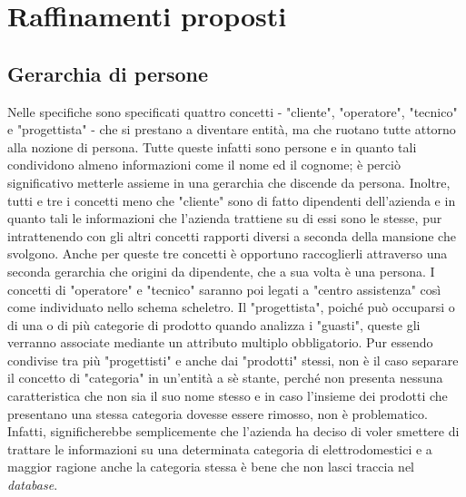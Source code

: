 \documentclass[a4paper, 12pt]{report}
\begin{document}
\section{Raffinamenti proposti}

\subsection{Gerarchia di persone}

Nelle specifiche sono specificati quattro concetti - "cliente", "operatore", "tecnico" e "progettista" - che si prestano a diventare entità, ma
che ruotano tutte attorno alla nozione di persona. Tutte queste infatti sono persone e in quanto tali condividono almeno informazioni come il nome
ed il cognome; è perciò significativo metterle assieme in una gerarchia che discende da persona. Inoltre, tutti e tre i concetti meno che "cliente"
sono di fatto dipendenti dell'azienda e in quanto tali le informazioni che l'azienda trattiene su di essi sono le stesse, pur intrattenendo con gli
altri concetti rapporti diversi a seconda della mansione che svolgono. Anche per queste tre concetti è opportuno raccoglierli attraverso una seconda
gerarchia che origini da dipendente, che a sua volta è una persona. I concetti di "operatore" e "tecnico" saranno poi legati a "centro assistenza"
così come individuato nello schema scheletro. Il "progettista", poiché può occuparsi o di una o di più categorie di prodotto quando analizza i "guasti",
queste gli verranno associate mediante un attributo multiplo obbligatorio. Pur essendo condivise tra più "progettisti" e anche dai "prodotti" stessi,
non è il caso separare il concetto di "categoria" in un'entità a sè stante, perché non presenta nessuna caratteristica che non sia il suo nome stesso
e in caso l'insieme dei prodotti che presentano una stessa categoria dovesse essere rimosso, non è problematico. Infatti, significherebbe semplicemente
che l'azienda ha deciso di voler smettere di trattare le informazioni su una determinata categoria di elettrodomestici e a maggior ragione anche la
categoria stessa è bene che non lasci traccia nel \textit{database}.
\end{document}
